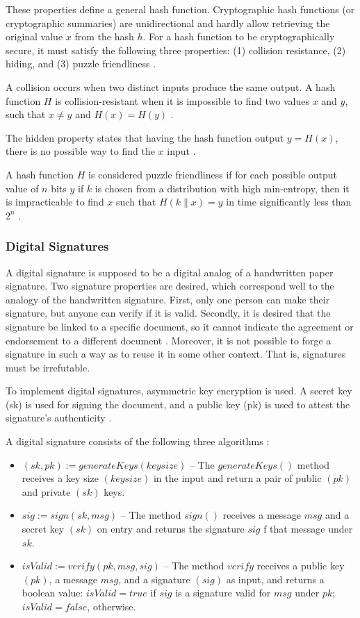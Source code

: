 These properties define a general hash function. Cryptographic hash functions (or cryptographic summaries) are unidirectional and hardly allow retrieving the original value $x$ from the hash $h$. For a hash function to be cryptographically secure, it must satisfy the following three properties: (1) collision resistance, (2) hiding, and (3) puzzle friendliness \cite{greve2018blockchain}.

A collision occurs when two distinct inputs produce the same output. A hash function $H$ is collision-resistant when it is impossible to find two values $x$ and $y$, such that $x \neq y$ and $H(x) = H(y)$ \cite{narayanan2016bitcoin}.

The hidden property states that having the hash function output $y = H (x)$, there is no possible way to find the $x$ input \cite{greve2018blockchain}.

A hash function $H$ is considered puzzle friendliness if for each possible output value of $n$ bits $y$ if $k$ is chosen from a distribution with high min-entropy, then it is impracticable to find $x$ such that $H (k \| x) = y$ in time significantly less than $2^n$ \cite{narayanan2016bitcoin}.

\subsubsection{Digital Signatures}\label{sec:assinaturasDigitais}
A digital signature is supposed to be a digital analog of a handwritten paper signature. Two signature properties are desired, which correspond well to the analogy of the handwritten signature. First, only one person can make their signature, but anyone can verify if it is valid. Secondly, it is desired that the signature be linked to a specific document, so it cannot indicate the agreement or endorsement to a different document \cite{merkle1989certified}. Moreover, it is not possible to forge a signature in such a way as to reuse it in some other context. That is, signatures must be irrefutable.

To implement digital signatures, asymmetric key encryption is used. A secret key (sk) is used for signing the document, and a public key (pk) is used to attest the signature's authenticity \cite{greve2018blockchain}.

A digital signature consists of the following three algorithms \cite{narayanan2016bitcoin}:

\begin{itemize}
\item $(sk , pk) := generateKeys(keysize)$ – The $generateKeys()$ method receives a key size $(keysize)$ in the input and return a pair of public $(pk)$ and private $(sk)$ keys.
\item $sig := sign(sk , msg)$ – The method $sign()$ receives a message $msg$ and a secret key $(sk)$ on entry and returns the signature $sig$ f that message under $sk$.
\item $isValid := verify(pk , msg , sig)$ – The method $verify$ receives a public key $(pk)$, a message $msg$, and a signature $(sig)$ as input, and returns a boolean value: $isValid = true$ if $sig$ is a signature valid for $msg$ under $pk$; $isValid = false$, otherwise.
\end{itemize}

